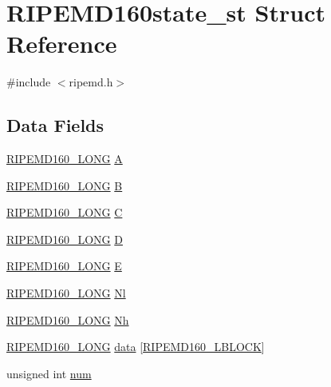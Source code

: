 \hypertarget{struct_r_i_p_e_m_d160state__st}{}\section{R\+I\+P\+E\+M\+D160state\+\_\+st Struct Reference}
\label{struct_r_i_p_e_m_d160state__st}


{\ttfamily \#include $<$ripemd.\+h$>$}

\subsection*{Data Fields}
\begin{DoxyCompactItemize}
\item 
\hyperlink{ripemd_8h_ad140fdb90a6a782fd82cfbe1a973dc3e}{R\+I\+P\+E\+M\+D160\+\_\+\+L\+O\+NG} \hyperlink{struct_r_i_p_e_m_d160state__st_acd47b84e3c71e1507ad5228195716a51}{A}
\item 
\hyperlink{ripemd_8h_ad140fdb90a6a782fd82cfbe1a973dc3e}{R\+I\+P\+E\+M\+D160\+\_\+\+L\+O\+NG} \hyperlink{struct_r_i_p_e_m_d160state__st_a1e5fa97edad3c70dd52f5df645113790}{B}
\item 
\hyperlink{ripemd_8h_ad140fdb90a6a782fd82cfbe1a973dc3e}{R\+I\+P\+E\+M\+D160\+\_\+\+L\+O\+NG} \hyperlink{struct_r_i_p_e_m_d160state__st_ad97608d0b1885397727f984432a5eb5f}{C}
\item 
\hyperlink{ripemd_8h_ad140fdb90a6a782fd82cfbe1a973dc3e}{R\+I\+P\+E\+M\+D160\+\_\+\+L\+O\+NG} \hyperlink{struct_r_i_p_e_m_d160state__st_a90895d0f185100a23c25bacf0472e332}{D}
\item 
\hyperlink{ripemd_8h_ad140fdb90a6a782fd82cfbe1a973dc3e}{R\+I\+P\+E\+M\+D160\+\_\+\+L\+O\+NG} \hyperlink{struct_r_i_p_e_m_d160state__st_a35deef8cdf160a57f68c804445bb1efa}{E}
\item 
\hyperlink{ripemd_8h_ad140fdb90a6a782fd82cfbe1a973dc3e}{R\+I\+P\+E\+M\+D160\+\_\+\+L\+O\+NG} \hyperlink{struct_r_i_p_e_m_d160state__st_a7a7c8ce228e46f3f324b844b7bbc6f9b}{Nl}
\item 
\hyperlink{ripemd_8h_ad140fdb90a6a782fd82cfbe1a973dc3e}{R\+I\+P\+E\+M\+D160\+\_\+\+L\+O\+NG} \hyperlink{struct_r_i_p_e_m_d160state__st_a086befb9b3366d4eff91be436257de1f}{Nh}
\item 
\hyperlink{ripemd_8h_ad140fdb90a6a782fd82cfbe1a973dc3e}{R\+I\+P\+E\+M\+D160\+\_\+\+L\+O\+NG} \hyperlink{struct_r_i_p_e_m_d160state__st_a13e351c7c91f20f5a4126a1b85250776}{data} \mbox{[}\hyperlink{ripemd_8h_a2a4ee496dfe1ef71297132c92c10f71c}{R\+I\+P\+E\+M\+D160\+\_\+\+L\+B\+L\+O\+CK}\mbox{]}
\item 
unsigned int \hyperlink{struct_r_i_p_e_m_d160state__st_a41ddefd3473727cad32a9767c10faed8}{num}
\end{DoxyCompactItemize}


